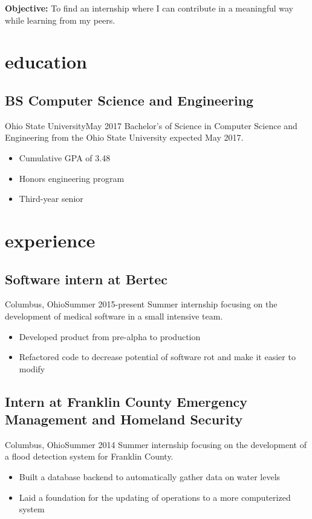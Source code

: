 \documentclass[letterpaper]{cv}
\begin{document}
	\author{Brandon A. Moore}
	\maketitle
	
	\noindent\textbf{\Large{Objective:}} To find an internship where I can contribute in a meaningful way while learning from my peers.

	\section{education}

	\subsection{BS Computer Science and Engineering}{Ohio State University}{May 2017}
			Bachelor's of Science in Computer Science and Engineering from the Ohio State University expected May 2017.
			\begin{itemize}
				\item Cumulative GPA of 3.48
				\item Honors engineering program
				\item Third-year senior
			\end{itemize}

	\section{experience}

	\subsection{Software intern at Bertec}{Columbus, Ohio}{Summer 2015-present}
			Summer internship focusing on the development of medical software in a small intensive team.
			\begin{itemize}
				\item Developed product from pre-alpha to production
				\item Refactored code to decrease potential of software rot and make it easier to modify
			\end{itemize}
	
		\subsection{Intern at Franklin County Emergency\\ Management and Homeland Security}{Columbus, Ohio}{Summer 2014}
			Summer internship focusing on the development of a flood detection system for Franklin County.
			\begin{itemize}
				\item Built a database backend to automatically gather data on water levels
				\item Laid a foundation for the updating of operations to a more computerized system
			\end{itemize}
\end{document}
